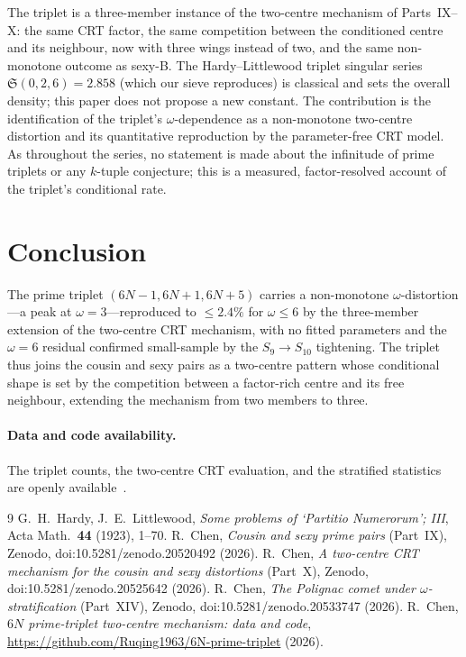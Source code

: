 \documentclass[11pt]{article}
\begin{document}
The triplet is a three-member instance of the two-centre mechanism of Parts~IX--X:
the same CRT factor, the same competition between the conditioned centre and its
neighbour, now with three wings instead of two, and the same non-monotone outcome
as sexy-B. The Hardy--Littlewood triplet singular series
$\mathfrak{S}(0,2,6)=2.858$ (which our sieve reproduces) is classical and sets the
overall density; this paper does not propose a new constant. The contribution is
the identification of the triplet's $\omega$-dependence as a non-monotone
two-centre distortion and its quantitative reproduction by the parameter-free CRT
model. As throughout the series, no statement is made about the infinitude of
prime triplets or any $k$-tuple conjecture; this is a measured, factor-resolved
account of the triplet's conditional rate.

\section{Conclusion}

The prime triplet $(6N-1,6N+1,6N+5)$ carries a non-monotone $\omega$-distortion---a
peak at $\omega=3$---reproduced to $\le2.4\%$ for $\omega\le6$ by the three-member
extension of the two-centre CRT mechanism, with no fitted parameters and the
$\omega=6$ residual confirmed small-sample by the $S_9\to S_{10}$ tightening. The
triplet thus joins the cousin and sexy pairs as a two-centre pattern whose
conditional shape is set by the competition between a factor-rich centre and its
free neighbour, extending the mechanism from two members to three.

\paragraph{Data and code availability.}
The triplet counts, the two-centre CRT evaluation, and the stratified statistics
are openly available~\cite{repo}.

\begin{thebibliography}{9}
 G.~H.~Hardy, J.~E.~Littlewood, \emph{Some problems of `Partitio
Numerorum'; III}, Acta Math.\ \textbf{44} (1923), 1--70.
 R.~Chen, \emph{Cousin and sexy prime pairs} (Part~IX), Zenodo,
doi:10.5281/zenodo.20520492 (2026).
 R.~Chen, \emph{A two-centre CRT mechanism for the cousin and sexy
distortions} (Part~X), Zenodo, doi:10.5281/zenodo.20525642 (2026).
 R.~Chen, \emph{The Polignac comet under $\omega$-stratification}
(Part~XIV), Zenodo, doi:10.5281/zenodo.20533747 (2026).
 R.~Chen, \emph{$6N$ prime-triplet two-centre mechanism: data and
code}, \url{https://github.com/Ruqing1963/6N-prime-triplet} (2026).
\end{thebibliography}
\end{document}
